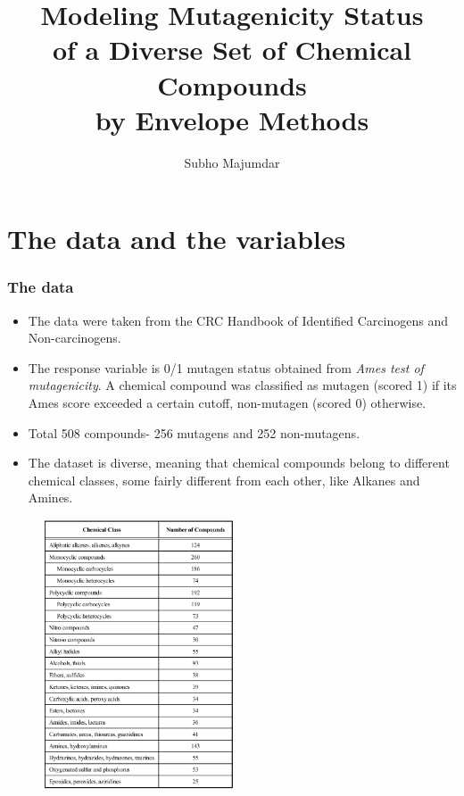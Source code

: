 \documentclass[handout,10pt]{beamer}
\title[Envelopes in Chemometrics]
{\Large  
Modeling Mutagenicity Status\\of a Diverse Set of Chemical Compounds\\by Envelope Methods
}
\author[]
{Subho Majumdar}
\institute[]
{School of Statistics, University of Minnesota}
\date [December 12, 2013]
\begin{document}
\frame{ \titlepage}


\section{The data and the variables}

\begin{frame}
\frametitle{The data}
\begin{itemize}
\item The data were taken from the CRC Handbook of Identified Carcinogens and Non-carcinogens.

\item The response variable is 0/1 mutagen status obtained from \textit{Ames test of mutagenicity}. A chemical compound was classified as mutagen (scored 1) if its Ames score exceeded a certain cutoff, non-mutagen (scored 0) otherwise.

\item Total 508 compounds- 256 mutagens and 252 non-mutagens.

\item The dataset is diverse, meaning that chemical compounds belong to different chemical classes, some fairly different from each other, like Alkanes and Amines.
\end{itemize}
\end{frame}

\begin{frame}
\begin{figure}\begin{center}
   \includegraphics[height=8cm]{class.png}
   \label{fig:fig1}
\end{center}\end{figure}
\end{frame}
\end{document}
